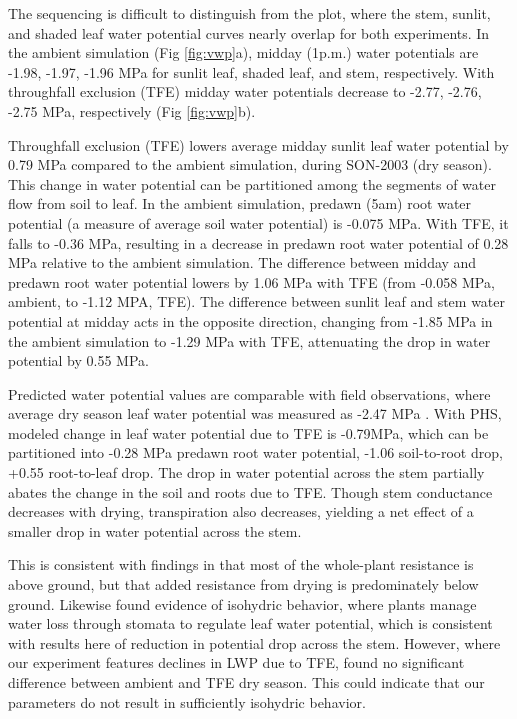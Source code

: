 \documentclass[draft,linenumbers]{agujournal}
\begin{document}
The sequencing is difficult to distinguish from the plot, where the stem, sunlit, and shaded leaf water potential curves nearly overlap for both experiments. 
In the ambient simulation (Fig \ref{fig:vwp}a), midday (1p.m.) water potentials are -1.98, -1.97, -1.96 MPa 
for sunlit leaf, shaded leaf, and stem, respectively.
With throughfall exclusion (TFE)  midday water potentials decrease to -2.77, -2.76, -2.75 MPa, respectively (Fig \ref{fig:vwp}b).

Throughfall exclusion (TFE) lowers average midday sunlit leaf water potential by 0.79 MPa compared to the ambient simulation, during SON-2003 (dry season).
This change in water potential can be partitioned among the segments of water flow from soil to leaf.
In the ambient simulation, predawn (5am) root water potential (a measure of average soil water potential) is -0.075 MPa. 
With TFE, it falls to -0.36 MPa, resulting in a decrease in predawn root water potential of 0.28 MPa relative to the ambient simulation. 
The difference between midday and predawn root water potential lowers by 1.06 MPa with TFE 
(from -0.058 MPa, ambient, to -1.12 MPA, TFE).
The difference between sunlit leaf and stem water potential at midday acts in the opposite direction, changing from
-1.85 MPa in the ambient simulation to -1.29 MPa with TFE, attenuating the drop in water potential by 0.55 MPa.

Predicted water potential values are comparable with field observations, where average dry season leaf water potential was measured as -2.47 MPa \citep{fisher2006}.
With PHS, modeled change in leaf water potential due to TFE is -0.79MPa, which can be partitioned into -0.28 MPa predawn root water potential, -1.06 soil-to-root drop, +0.55 root-to-leaf drop.
The drop in water potential across the stem partially abates the change in the soil and roots due to TFE. 
Though stem conductance decreases with drying, transpiration also decreases, yielding a net effect of a smaller drop in water potential across the stem.

This is consistent with findings in \cite{fisher2006} that most of the whole-plant resistance is above ground, but that added resistance from drying is predominately below ground.
Likewise \cite{fisher2006} found evidence of isohydric behavior, where plants manage water loss through stomata to regulate leaf water potential, 
which is consistent with results here of reduction in potential drop across the stem.
However, where our experiment features declines in LWP due to TFE, \cite{fisher2006} found no significant difference between ambient and TFE dry season.
This could indicate that our parameters do not result in sufficiently isohydric behavior.
\end{document}

